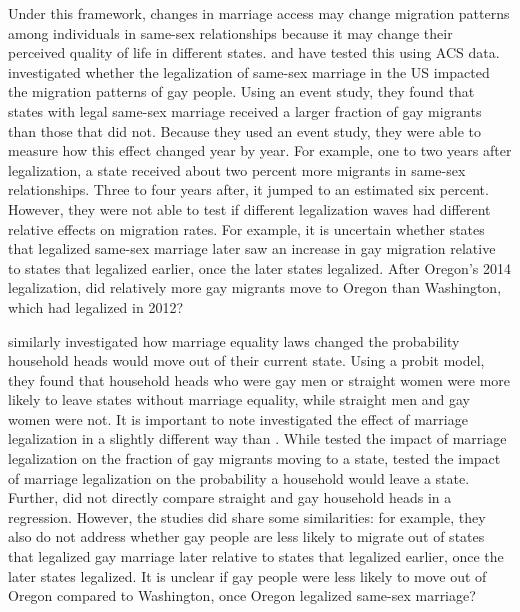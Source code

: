 \documentclass[12pt,letterpaper]{article}
\begin{document}
Under this framework, changes in marriage access may change migration patterns among individuals in same-sex relationships because it may change their perceived quality of life in different states. \citet{1} and \citet{12} have tested this using ACS data. \citet{1} investigated whether the legalization of same-sex marriage in the US impacted the migration patterns of gay people. Using an event study, they found that states with legal same-sex marriage received a larger fraction of gay migrants than those that did not. Because they used an event study, they were able to measure how this effect changed year by year. For example, one to two years after legalization, a state received about two percent more migrants in same-sex relationships. Three to four years after, it jumped to an estimated six percent. However, they were not able to test if different legalization waves had different relative effects on migration rates. For example, it is uncertain whether states that legalized same-sex marriage later saw an increase in gay migration relative to states that legalized earlier, once the later states legalized. After Oregon’s 2014 legalization, did relatively more gay migrants move to Oregon than Washington, which had legalized in 2012?

\citet{12} similarly investigated how marriage equality laws changed the probability household heads would move out of their current state. Using a probit model, they found that household heads who were gay men or straight women were more likely to leave states without marriage equality, while straight men and gay women were not. It is important to note \citet{12}  investigated the effect of marriage legalization in a slightly different way than \citet{1}. While \citet{1} tested the impact of marriage legalization on the fraction of gay migrants moving to a state, \citet{12} tested the impact of marriage legalization on the probability a household would leave a state. Further, \citet{12} did not directly compare straight and gay household heads in a regression. However, the studies did share some similarities: for example, they also do not address whether gay people are less likely to migrate out of states that legalized gay marriage later relative to states that legalized earlier, once the later states legalized. It is unclear if gay people were less likely to move out of Oregon compared to Washington, once Oregon legalized same-sex marriage?
\end{document}
